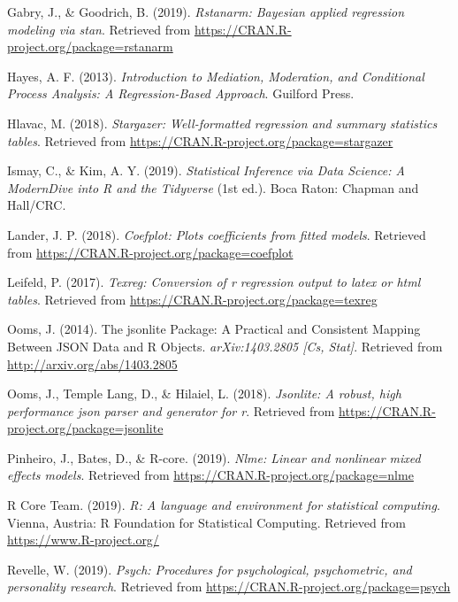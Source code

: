 \documentclass[doc,floatsintext]{apa6}
\begin{document}
\hypertarget{ref-R-rstanarm}{}
Gabry, J., \& Goodrich, B. (2019). \emph{Rstanarm: Bayesian applied
regression modeling via stan}. Retrieved from
\url{https://CRAN.R-project.org/package=rstanarm}

\hypertarget{ref-HayesIntroductionMediationModeration2013}{}
Hayes, A. F. (2013). \emph{Introduction to Mediation, Moderation, and
Conditional Process Analysis: A Regression-Based Approach}. Guilford
Press.

\hypertarget{ref-R-stargazer}{}
Hlavac, M. (2018). \emph{Stargazer: Well-formatted regression and
summary statistics tables}. Retrieved from
\url{https://CRAN.R-project.org/package=stargazer}

\hypertarget{ref-IsmayIntroductionStatisticalData}{}
Ismay, C., \& Kim, A. Y. (2019). \emph{Statistical Inference via Data
Science: A ModernDive into R and the Tidyverse} (1st ed.). Boca Raton:
Chapman and Hall/CRC.

\hypertarget{ref-R-coefplot}{}
Lander, J. P. (2018). \emph{Coefplot: Plots coefficients from fitted
models}. Retrieved from
\url{https://CRAN.R-project.org/package=coefplot}

\hypertarget{ref-R-texreg}{}
Leifeld, P. (2017). \emph{Texreg: Conversion of r regression output to
latex or html tables}. Retrieved from
\url{https://CRAN.R-project.org/package=texreg}

\hypertarget{ref-oomsJsonlitePackagePractical2014}{}
Ooms, J. (2014). The jsonlite Package: A Practical and Consistent
Mapping Between JSON Data and R Objects. \emph{arXiv:1403.2805 {[}Cs,
Stat{]}}. Retrieved from \url{http://arxiv.org/abs/1403.2805}

\hypertarget{ref-R-jsonlite}{}
Ooms, J., Temple Lang, D., \& Hilaiel, L. (2018). \emph{Jsonlite: A
robust, high performance json parser and generator for r}. Retrieved
from \url{https://CRAN.R-project.org/package=jsonlite}

\hypertarget{ref-R-nlme}{}
Pinheiro, J., Bates, D., \& R-core. (2019). \emph{Nlme: Linear and
nonlinear mixed effects models}. Retrieved from
\url{https://CRAN.R-project.org/package=nlme}

\hypertarget{ref-R-base}{}
R Core Team. (2019). \emph{R: A language and environment for statistical
computing}. Vienna, Austria: R Foundation for Statistical Computing.
Retrieved from \url{https://www.R-project.org/}

\hypertarget{ref-R-psych}{}
Revelle, W. (2019). \emph{Psych: Procedures for psychological,
psychometric, and personality research}. Retrieved from
\url{https://CRAN.R-project.org/package=psych}
\end{document}
